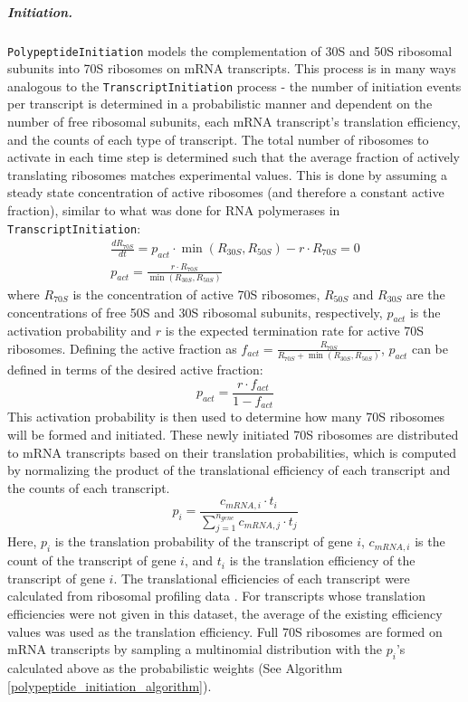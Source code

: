 \documentclass[12pt]{article}
\begin{document}
\subparagraph{Initiation.}
\texttt{PolypeptideInitiation} models the complementation of 30S and 50S ribosomal subunits into 70S ribosomes on mRNA transcripts. This process is in many ways analogous to the \texttt{TranscriptInitiation} process - the number of initiation events per transcript is determined in a probabilistic manner and dependent on the number of free ribosomal subunits, each mRNA transcript's translation efficiency, and the counts of each type of transcript. The total number of ribosomes to activate in each time step is determined such that the average fraction of actively translating ribosomes matches experimental values. This is done by assuming a steady state concentration of active ribosomes (and therefore a constant active fraction), similar to what was done for RNA polymerases in \texttt{TranscriptInitiation}:
\begin{gather}
    \frac{dR_{70S}}{dt} = p_{act}\cdot \min(R_{30S}, R_{50S}) - r \cdot R_{70S} = 0 \\
    p_{act} = \frac{r \cdot R_{70S}}{\min(R_{30S}, R_{50S})}
\end{gather}
\noindent where $R_{70S}$ is the concentration of active 70S ribosomes, $R_{50S}$ and $R_{30S}$ are the concentrations of free 50S and 30S ribosomal subunits, respectively, $p_{act}$ is the activation probability and $r$ is the expected termination rate for active 70S ribosomes. Defining the active fraction as $f_{act} = \frac{R_{70S}}{R_{70S} + \min(R_{30S}, R_{50S})}$, $p_{act}$ can be defined in terms of the desired active fraction:
\begin{equation}
    p_{act} = \frac{r\cdot f_{act}}{1 - f_{act}}
\end{equation}
This activation probability is then used to determine how many 70S ribosomes will be formed and initiated. These newly initiated 70S ribosomes are distributed to mRNA transcripts based on their translation probabilities, which is computed by normalizing the product of the translational efficiency of each transcript and the counts of each transcript.
\begin{equation}
p_i = \frac{c_{mRNA,i} \cdot t_i}{\sum\limits^{n_{gene}}_{j=1} c_{mRNA,j} \cdot t_j}
\end{equation}
Here, $p_i$ is the translation probability of the transcript of gene $i$, $c_{mRNA,i}$ is the count of the transcript of gene $i$, and $t_i$ is the translation efficiency of the transcript of gene $i$.  The translational efficiencies of each transcript were calculated from ribosomal profiling data \cite{li2014quantifying}. For transcripts whose translation efficiencies were not given in this dataset, the average of the existing efficiency values was used as the translation efficiency. Full 70S ribosomes are formed on mRNA transcripts by sampling a multinomial distribution with the $p_i$'s calculated above as the probabilistic weights (See Algorithm \ref{polypeptide_initiation_algorithm}).
\end{document}
